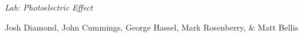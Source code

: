 {\LARGE {\em \noindent Lab: Photoelectric Effect}}

\large{\noindent Josh Diamond, John Cummings, George Hassel, Mark Rosenberry, \& Matt Bellis}
